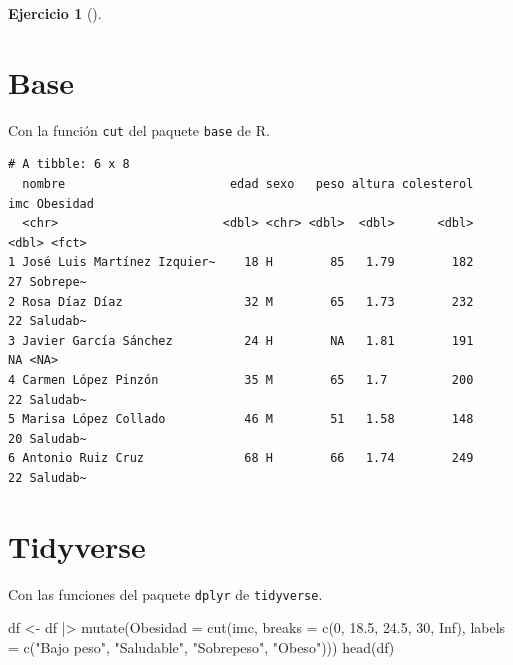 \documentclass[
  a4paper,
]{scrreport}
\newenvironment{Shaded}{\begin{snugshade}}{\end{snugshade}}
\newcommand{\AttributeTok}[1]{\textcolor[rgb]{0.40,0.45,0.13}{#1}}
\newcommand{\ConstantTok}[1]{\textcolor[rgb]{0.56,0.35,0.01}{#1}}
\newcommand{\DecValTok}[1]{\textcolor[rgb]{0.68,0.00,0.00}{#1}}
\newcommand{\FloatTok}[1]{\textcolor[rgb]{0.68,0.00,0.00}{#1}}
\newcommand{\FunctionTok}[1]{\textcolor[rgb]{0.28,0.35,0.67}{#1}}
\newcommand{\NormalTok}[1]{\textcolor[rgb]{0.00,0.23,0.31}{#1}}
\newcommand{\OtherTok}[1]{\textcolor[rgb]{0.00,0.23,0.31}{#1}}
\newcommand{\SpecialCharTok}[1]{\textcolor[rgb]{0.37,0.37,0.37}{#1}}
\newcommand{\StringTok}[1]{\textcolor[rgb]{0.13,0.47,0.30}{#1}}
\theoremstyle{definition}
\newtheorem{exercise}{Ejercicio}[chapter]
\theoremstyle{remark}
\begin{document}
\begin{exercise}[]
\begin{enumerate}
\begin{tcolorbox}
  \section{Base}

  Con la función \texttt{cut} del paquete \texttt{base} de R.

\begin{Shaded}
\end{Shaded}

\begin{verbatim}
# A tibble: 6 x 8
  nombre                       edad sexo   peso altura colesterol   imc Obesidad
  <chr>                       <dbl> <chr> <dbl>  <dbl>      <dbl> <dbl> <fct>   
1 José Luis Martínez Izquier~    18 H        85   1.79        182    27 Sobrepe~
2 Rosa Díaz Díaz                 32 M        65   1.73        232    22 Saludab~
3 Javier García Sánchez          24 H        NA   1.81        191    NA <NA>    
4 Carmen López Pinzón            35 M        65   1.7         200    22 Saludab~
5 Marisa López Collado           46 M        51   1.58        148    20 Saludab~
6 Antonio Ruiz Cruz              68 H        66   1.74        249    22 Saludab~
\end{verbatim}

  \section{Tidyverse}

  Con las funciones del paquete \texttt{dplyr} de \texttt{tidyverse}.

\begin{Shaded}
\begin{Highlighting}[]
\NormalTok{df }\OtherTok{\textless{}{-}}\NormalTok{ df }\SpecialCharTok{|\textgreater{}}
    \FunctionTok{mutate}\NormalTok{(}\AttributeTok{Obesidad =} \FunctionTok{cut}\NormalTok{(imc, }\AttributeTok{breaks =} \FunctionTok{c}\NormalTok{(}\DecValTok{0}\NormalTok{, }\FloatTok{18.5}\NormalTok{, }\FloatTok{24.5}\NormalTok{, }\DecValTok{30}\NormalTok{, }\ConstantTok{Inf}\NormalTok{), }\AttributeTok{labels =} \FunctionTok{c}\NormalTok{(}\StringTok{"Bajo peso"}\NormalTok{, }\StringTok{"Saludable"}\NormalTok{, }\StringTok{"Sobrepeso"}\NormalTok{, }\StringTok{"Obeso"}\NormalTok{)))}
\FunctionTok{head}\NormalTok{(df)}
\end{Highlighting}
\end{Shaded}


\end{tcolorbox}
\end{enumerate}
\end{exercise}
\end{document}
